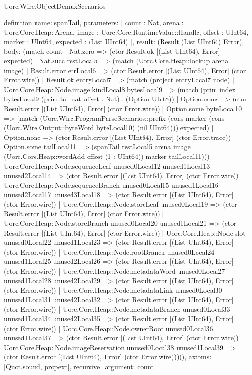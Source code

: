\begin{lexlean}{Uorc.Wire.ObjectDemuxScenarios}
\begin{semanticmodule}
definition{
  name: spanTail,
  parameters: [
    count : Nat,
    arena : Uorc.Core.Heap::Arena,
    image : Uorc.Core.RuntimeValue::Handle,
    offset : UInt64,
    marker : UInt64,
    expected : (List UInt64)
  ],
  result: (Result (List UInt64) Error),
  body: (match count
    | Nat.zero => (ctor Result.ok [(List UInt64), Error] expected)
    | Nat.succ restLocal5 => (match (Uorc.Core.Heap::lookup arena image)
      | Result.error errLocal6 => (ctor Result.error [(List UInt64), Error] (ctor Error.wire))
      | Result.ok entryLocal7 => (match (project entryLocal7 node)
        | Uorc.Core.Heap::Node.image kindLocal8 bytesLocal9 => (match (prim index bytesLocal9 (prim to_nat offset : Nat) : (Option UInt8))
          | Option.none => (ctor Result.error [(List UInt64), Error] (ctor Error.wire))
          | Option.some byteLocal10 => (match (Uorc.Wire.ProgramParseScenarios::prefix (cons marker (cons (Uorc.Wire.Output::byteWord byteLocal10) (nil UInt64))) expected)
            | Option.none => (ctor Result.error [(List UInt64), Error] (ctor Error.trace))
            | Option.some tailLocal11 => (spanTail restLocal5 arena image (Uorc.Core.Heap::wordAdd offset (1 : UInt64)) marker tailLocal11)))
        | Uorc.Core.Heap::Node.sequenceLeaf unused0Local12 unused1Local13 unused2Local14 => (ctor Result.error [(List UInt64), Error] (ctor Error.wire))
        | Uorc.Core.Heap::Node.sequenceBranch unused0Local15 unused1Local16 unused2Local17 unused3Local18 => (ctor Result.error [(List UInt64), Error] (ctor Error.wire))
        | Uorc.Core.Heap::Node.storeLeaf unused0Local19 => (ctor Result.error [(List UInt64), Error] (ctor Error.wire))
        | Uorc.Core.Heap::Node.storeBranch unused0Local20 unused1Local21 => (ctor Result.error [(List UInt64), Error] (ctor Error.wire))
        | Uorc.Core.Heap::Node.slot unused0Local22 unused1Local23 => (ctor Result.error [(List UInt64), Error] (ctor Error.wire))
        | Uorc.Core.Heap::Node.rootBranch unused0Local24 unused1Local25 unused2Local26 => (ctor Result.error [(List UInt64), Error] (ctor Error.wire))
        | Uorc.Core.Heap::Node.metadataWord unused0Local27 unused1Local28 unused2Local29 => (ctor Result.error [(List UInt64), Error] (ctor Error.wire))
        | Uorc.Core.Heap::Node.metadataLink unused0Local30 unused1Local31 unused2Local32 => (ctor Result.error [(List UInt64), Error] (ctor Error.wire))
        | Uorc.Core.Heap::Node.metadataBranch unused0Local33 unused1Local34 unused2Local35 => (ctor Result.error [(List UInt64), Error] (ctor Error.wire))
        | Uorc.Core.Heap::Node.ownerRoot unused0Local36 unused1Local37 => (ctor Result.error [(List UInt64), Error] (ctor Error.wire))
        | Uorc.Core.Heap::Node.imageReservation unused0Local38 unused1Local39 => (ctor Result.error [(List UInt64), Error] (ctor Error.wire))))),
  axioms: [Quot.sound, propext],
  recursive_argument: count
}


\end{semanticmodule}
\end{lexlean}
